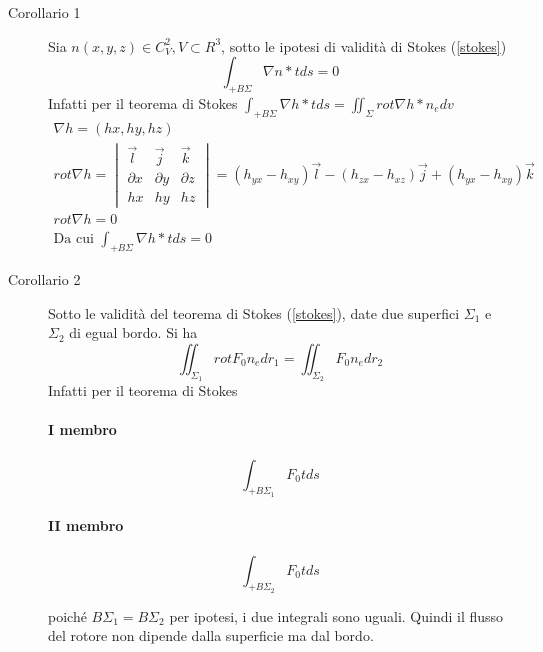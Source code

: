 \begin{description}
\item[Corollario 1]
  \begin{defi}
    Sia $n(x,y,z)\in C_V^2,V\subset R^3$, sotto le ipotesi di validità di Stokes
    (\ref{stokes})
    \begin{equation*}
      \int_{+B\Sigma}\nabla n * tds =0
    \end{equation*}
    Infatti per il teorema di Stokes $\int_{+B\Sigma}\nabla h*t ds=\iint_\Sigma rot \nabla h*n_e dv$
    \begin{eqnarray*}
      \nabla h=(hx,hy,hz)\\
      rot \nabla h=\begin{vmatrix}
                     \vec{l} & \vec{j} &\vec{k}\\
                     \partial x & \partial y & \partial z\\
                     hx & hy & hz
                   \end{vmatrix}
      =(h_{yx}-h_{xy})\vec{l}- (h_{zx}-h_{xz})\vec{j} + (h_{yx}-h_{xy})\vec{k}\\
      rot \nabla h=0\\
      \text{Da cui } \int_{+B\Sigma}\nabla h * t ds=0
    \end{eqnarray*}
  \end{defi}
  \clearpage
\item[Corollario 2]
  \begin{defi}
    Sotto le validità del teorema di Stokes (\ref{stokes}), date due superfici $\Sigma_1$
    e $\Sigma_2$ di egual bordo. Si ha
    \begin{equation*}
      \iint_{\Sigma_1} rot F_0 n_e dr_1=\iint_{\Sigma_2}F_0n_e dr_2
    \end{equation*}
   Infatti per il teorema di Stokes
  \begin{multicols}{2}
    \paragraph{I membro}
    \begin{equation*}
      \int_{+B\Sigma_1}F_0tds
    \end{equation*}
    \paragraph{II membro}
    \begin{equation*}
      \int_{+B\Sigma_2}F_0t ds
    \end{equation*}
  \end{multicols}
  poiché $B\Sigma_1=B\Sigma_2$ per ipotesi, i due integrali sono uguali. Quindi il flusso
  del rotore non dipende dalla superficie ma dal bordo.
  \end{defi}
\end{description}

